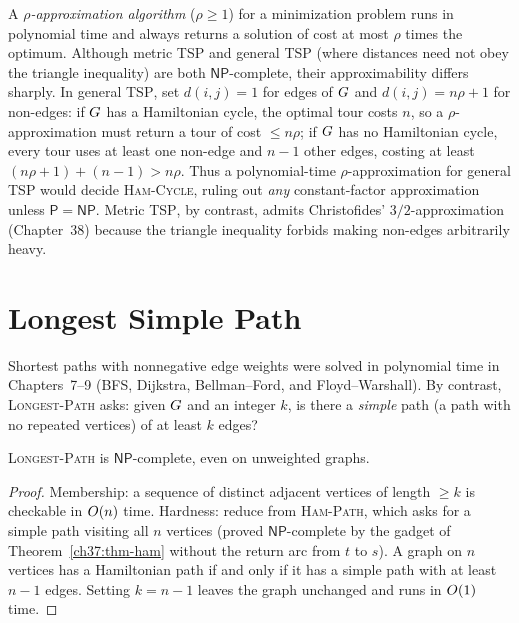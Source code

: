 \begin{trapbox}
A \emph{$\rho$-approximation algorithm} ($\rho\ge 1$) for a minimization problem runs in polynomial time and always returns a solution of cost at most $\rho$ times the optimum. Although metric \textsc{TSP} and general \textsc{TSP} (where distances need not obey the triangle inequality) are both $\mathsf{NP}$-complete, their approximability differs sharply. In general \textsc{TSP}, set $d(i,j)=1$ for edges of $G$ and $d(i,j)=n\rho+1$ for non-edges: if $G$ has a Hamiltonian cycle, the optimal tour costs $n$, so a $\rho$-approximation must return a tour of cost $\le n\rho$; if $G$ has no Hamiltonian cycle, every tour uses at least one non-edge and $n-1$ other edges, costing at least $(n\rho+1)+(n-1) > n\rho$. Thus a polynomial-time $\rho$-approximation for general \textsc{TSP} would decide \textsc{Ham-Cycle}, ruling out \emph{any} constant-factor approximation unless $\mathsf{P}=\mathsf{NP}$. Metric \textsc{TSP}, by contrast, admits Christofides' $3/2$-approximation (Chapter~38) because the triangle inequality forbids making non-edges arbitrarily heavy.
\end{trapbox}

\section{Longest Simple Path}
\label{ch37:longest}

Shortest paths with nonnegative edge weights were solved in polynomial time in Chapters~7--9 (BFS, Dijkstra, Bellman--Ford, and Floyd--Warshall). By contrast, \textsc{Longest-Path} asks: given $G$ and an integer $k$, is
there a \emph{simple} path (a path with no repeated vertices) of at least $k$ edges?

\begin{theorem}
\label{ch37:thm-longest}
\textsc{Longest-Path} is $\mathsf{NP}$-complete, even on unweighted graphs.
\end{theorem}

\begin{proof}
Membership: a sequence of distinct adjacent vertices of length $\ge k$ is checkable in $O(n)$ time. Hardness: reduce from
\textsc{Ham-Path}, which asks for a simple path visiting all $n$ vertices (proved $\mathsf{NP}$-complete by the gadget of Theorem~\ref{ch37:thm-ham} without the return arc from $t$ to $s$). A graph
on $n$ vertices has a Hamiltonian path if and only if it has a simple path with at least $n-1$
edges. Setting $k=n-1$ leaves the graph unchanged and runs in $O(1)$ time.
\end{proof}

